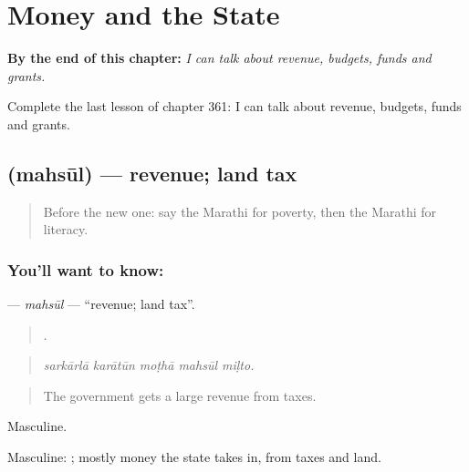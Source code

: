 
\chapter{Money and the State}
\label{ch:mr-money-and-the-state}

\begin{chapteropening}
\textbf{By the end of this chapter:} \emph{I can talk about revenue, budgets, funds and grants.}

Complete the last lesson of chapter 361: I can talk about revenue, budgets, funds and grants.
\end{chapteropening}

\section[\texorpdfstring{\mr{महसूल} (mahsūl)}{महसूल (mahsūl)}]{ (mahsūl) — revenue; land tax}

\label{lesson:MR-C361-mahsul}



\begin{quote}
Before the new one: say the Marathi for poverty, then the Marathi for literacy.
\end{quote}

\subsection*{You'll want to know: }
\textbf{} — \emph{mahsūl} — \textquotedblleft{}revenue; land tax\textquotedblright{}.

\begin{quote}
    .
\end{quote}

\begin{quote}
\emph{sarkārlā karātūn moṭhā mahsūl miḷto.}
\end{quote}

\begin{quote}
The government gets a large revenue from taxes.
\end{quote}

Masculine.

Masculine:  ; mostly money the state takes in, from taxes and land.

